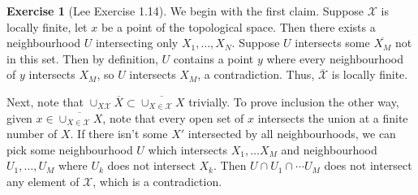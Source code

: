 \documentclass[aps,pra,showpacs,notitlepage,onecolumn,superscriptaddress,nofootinbib]{revtex4-1}
\theoremstyle{definition}
\newtheorem{exercise}{Exercise}[section]
\begin{document}
\begin{exercise}[Lee Exercise 1.14]
We begin with the first claim. Suppose $\mathcal{X}$ is locally finite, let $x$ be a point of the topological space. Then there exists a neighbourhood $U$ intersecting only $X_1, \dots, X_N$. Suppose $U$ intersects
some $\overline{X_M}$ not in this set. Then by definition, $U$ contains a point $y$ where every neighbourhood of $y$ intersects $X_M$, so $U$ intersects $X_M$, a contradiction. Thus, $\overline{\mathcal{X}}$ is locally finite.

Next, note that $\cup_{X \mathcal{X}} \overline{X} \subset \overline{\cup_{X \in \mathcal{X}} X}$ trivially. To prove inclusion the other way, given $x \in \overline{\cup_{X \in \mathcal{X}} X}$, note that every open set of $x$ intersects the union at a finite number of $X$. If there isn't some $X'$ intersected by all neighbourhoods, we can pick some neighbourhood $U$ which intersects $X_1, \dots X_M$ and neighbourhood $U_1, \dots, U_M$ where $U_k$ does not intersect $X_k$. Then $U \cap U_1 \cap \cdots U_M$ does not intersect any element of $\mathcal{X}$, which is a contradiction.
\end{exercise}
\end{document}
